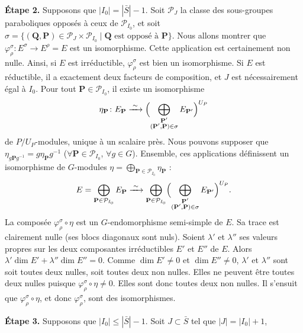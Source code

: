 \documentclass[10pt,a4paper]{article}
\theoremstyle{plain}
\theoremstyle{definition}
\theoremstyle{remark}
\newcommand{\cP}{\mathcal{P}}
\newcommand{\bP}{\mathbf{P}}
\newcommand{\bQ}{\mathbf{Q}}
\begin{document}
\smallskip
\noindent\textbf{Étape 2.} Supposons que $|I_0| = |\bar S| - 1$. Soit $\cP_J$ la classe des sous-groupes paraboliques opposés à ceux de $\cP_{I_0}$, et soit $\sigma = \{(\bQ,\bP) \in \cP_J \times \cP_{I_0} \mid \text{$\bQ$ est opposé à $\bP$}\}$. Nous allons montrer que $\varphi_\rho^\sigma \colon E^\sigma \to E^\rho = E$ est un isomorphisme. Cette application est certainement non nulle. Ainsi, si $E$ est irréductible, $\varphi_\rho^\sigma$ est bien un isomorphisme. Si $E$ est réductible, il a exactement deux facteurs de composition, et $J$ est nécessairement égal à $I_0$. Pour tout $\bP \in \cP_{I_0}$, il existe un isomorphisme
\begin{equation*}
\eta_{\bP} \colon E_{\bP} \xrightarrow{\;\sim\;} \Bigl(\bigoplus_{\substack{\bP'\\(\bP',\bP) \in \sigma}} E_{\bP'}\Bigr)^{U_P}
\end{equation*}
de $P/U_P$-modules, unique à un scalaire près. Nous pouvons supposer que $\eta_{g\bP g^{-1}} = g\eta_{\bP} g^{-1}$ ($\forall \bP \in \cP_{I_0}$, $\forall g \in G$). Ensemble, ces applications définissent un isomorphisme de $G$-modules $\eta = \bigoplus_{\bP \in \cP_{I_0}} \eta_{\bP}$ :
\begin{equation*}
E = \bigoplus_{\bP \in \cP_{I_0}} E_{\bP} \xrightarrow{\;\sim\;} \bigoplus_{\bP \in \cP_{I_0}}\Bigl(\bigoplus_{\substack{\bP'\\(\bP',\bP) \in \sigma}} E_{\bP'}\Bigr)^{U_P}.
\end{equation*}
La composée $\varphi_\rho^\sigma \circ \eta$ est un $G$-endomorphisme semi-simple de $E$. Sa trace est clairement nulle (ses blocs diagonaux sont nuls). Soient $\lambda'$ et $\lambda''$ ses valeurs propres sur les deux composantes irréductibles $E'$ et $E''$ de $E$. Alors $\lambda' \dim E' + \lambda'' \dim E'' = 0$. Comme $\dim E' \neq 0$ et $\dim E'' \neq 0$, $\lambda'$ et $\lambda''$ sont soit toutes deux nulles, soit toutes deux non nulles. Elles ne peuvent être toutes deux nulles puisque $\varphi_\rho^\sigma \circ \eta \neq 0$. Elles sont donc toutes deux non nulles. Il s'ensuit que $\varphi_\rho^\sigma \circ \eta$, et donc $\varphi_\rho^\sigma$, sont des isomorphismes.

\smallskip
\noindent\textbf{Étape 3.} Supposons que $|I_0| \leq |\bar S| - 1$. Soit $J \subset \bar S$ tel que $|J| = |I_0| + 1$,
\end{document}
